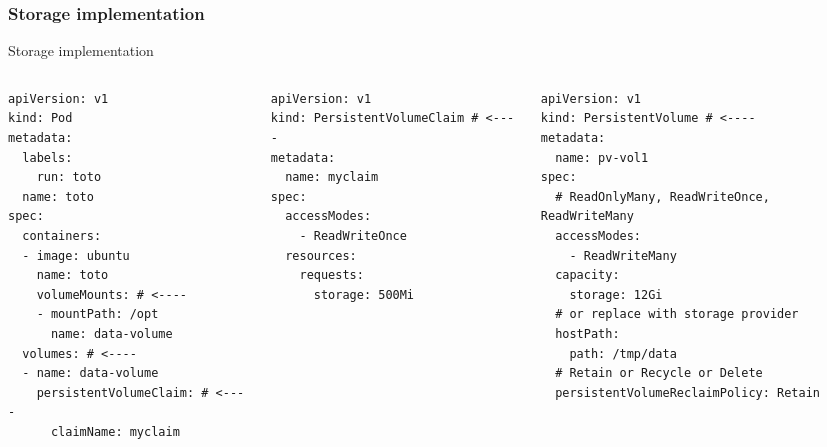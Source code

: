 \subsubsection{Storage implementation}
\begin{frame}[fragile]{Storage implementation}
\begin{small}
\begin{columns}
  \begin{column}{0.33\linewidth}
    \begin{lstlisting}
apiVersion: v1
kind: Pod
metadata:
  labels:
    run: toto
  name: toto
spec:
  containers:
  - image: ubuntu
    name: toto
    volumeMounts: # <----
    - mountPath: /opt
      name: data-volume
  volumes: # <----
  - name: data-volume
    persistentVolumeClaim: # <----
      claimName: myclaim
    \end{lstlisting}
  \end{column}

  \begin{column}{0.33\linewidth}
    \begin{lstlisting}
apiVersion: v1
kind: PersistentVolumeClaim # <----
metadata:
  name: myclaim
spec:
  accessModes:
    - ReadWriteOnce
  resources:
    requests:
      storage: 500Mi
    \end{lstlisting}
  \end{column}

  \begin{column}{0.33\linewidth}
    \begin{lstlisting}
apiVersion: v1
kind: PersistentVolume # <----
metadata:
  name: pv-vol1
spec:
  # ReadOnlyMany, ReadWriteOnce, ReadWriteMany
  accessModes:
    - ReadWriteMany
  capacity:
    storage: 12Gi
  # or replace with storage provider
  hostPath:
    path: /tmp/data
  # Retain or Recycle or Delete
  persistentVolumeReclaimPolicy: Retain
      \end{lstlisting}
  \end{column}
\end{columns}
\end{small}
\end{frame}
